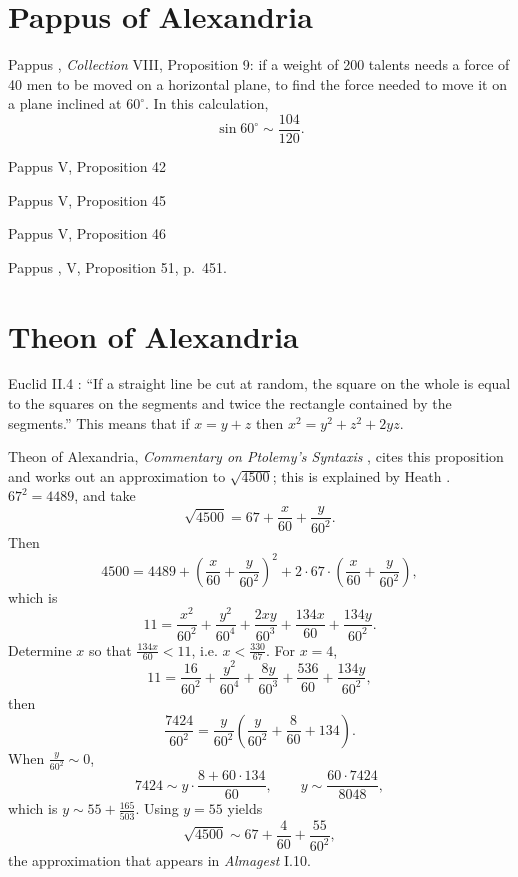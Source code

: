 \documentclass{amsart}
\theoremstyle{definition}
\begin{document}
\section{Pappus of Alexandria}
Pappus  \cite[pp.~1057--1059]{pappusIIIi}, {\em Collection} VIII, Proposition 9: 
if a weight of 200 talents needs a force of 40 men to be moved on a horizontal plane,
to find the force needed to move it on a plane inclined at $60^\circ$.
In this calculation,
\[
\sin 60^\circ \sim \frac{104}{120}.
\]

Pappus V, Proposition 42

Pappus V, Proposition 45

Pappus V, Proposition 46

Pappus \cite[p.~1244]{pappusIIIi}, V, Proposition 51, p.~451. 





\section{Theon of Alexandria}
Euclid II.4 \cite[p.~379]{euclidI}: ``If a straight line be cut at random, the square on the whole
is equal to the squares on the segments and twice the rectangle contained by the segments.''
This means that if $x=y+z$ then $x^2=y^2+z^2+2yz$. 

Theon of Alexandria, {\em Commentary on Ptolemy's Syntaxis} \cite[pp.~52--61]{thomasI},
cites this proposition and works out an approximation to 
$\sqrt{4500}$; this is explained by Heath \cite[pp.~60--63]{HGMI}.
$67^2=4489$, and take
\[
\sqrt{4500} = 67 + \frac{x}{60}+\frac{y}{60^2}.
\]
Then
\[
4500 = 4489 + \left(  \frac{x}{60}+\frac{y}{60^2} \right)^2 + 2 \cdot 67 \cdot  \left(  \frac{x}{60}+\frac{y}{60^2} \right),
\]
which is
\[
11 = \frac{x^2}{60^2}+\frac{y^2}{60^4} +  \frac{2xy}{60^3} + \frac{134x}{60} + \frac{134y}{60^2}.
\]
Determine $x$ so that $\frac{134x}{60} < 11$, i.e. $x<\frac{330}{67}$. For $x=4$,
\[
11 = \frac{16}{60^2} + \frac{y^2}{60^4} + \frac{8y}{60^3} + \frac{536}{60} + \frac{134y}{60^2},
\]
then
\[
\frac{7424}{60^2} =\frac{y}{60^2} \left(  \frac{y}{60^2} + \frac{8}{60} +134\right).
\]
When $\frac{y}{60^2} \sim 0$, 
\[
7424 \sim y \cdot \frac{8+60\cdot 134}{60}, \qquad y \sim 
\frac{60 \cdot 7424}{8048},
\]
which is $y \sim 55 + \frac{165}{503}$. Using $y=55$ yields
\[
\sqrt{4500} \sim 67 + \frac{4}{60} + \frac{55}{60^2},
\]
the approximation that appears in {\em Almagest} I.10.
\end{document}
